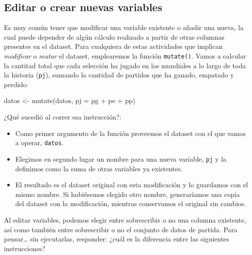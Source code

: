 \documentclass[
]{book}
\newenvironment{Shaded}{\begin{snugshade}}{\end{snugshade}}
\newcommand{\AttributeTok}[1]{\textcolor[rgb]{0.77,0.63,0.00}{#1}}
\newcommand{\FunctionTok}[1]{\textcolor[rgb]{0.00,0.00,0.00}{#1}}
\newcommand{\NormalTok}[1]{#1}
\newcommand{\OtherTok}[1]{\textcolor[rgb]{0.56,0.35,0.01}{#1}}
\newcommand{\SpecialCharTok}[1]{\textcolor[rgb]{0.00,0.00,0.00}{#1}}
\providecommand{\tightlist}{%
  \setlength{\itemsep}{0pt}\setlength{\parskip}{0pt}}
\begin{document}
\hypertarget{editar-o-crear-nuevas-variables}{%
\subsection{Editar o crear nuevas variables}\label{editar-o-crear-nuevas-variables}}

Es muy común tener que modificar una variable existente o añadir una nueva, la cual puede depender de algún cálculo realizado a partir de otras columnas presentes en el dataset. Para cualquiera de estas actividades que implican \emph{modificar} o \emph{mutar} el dataset, emplearemos la función \texttt{mutate()}. Vamos a calcular la cantitad total que cada selección ha jugado en los mundiales a lo largo de toda la historia (\texttt{pj}), sumando la cantidad de partidos que ha ganado, empatado y perdido:

\begin{Shaded}
\begin{Highlighting}[]
\NormalTok{datos }\OtherTok{\textless{}{-}} \FunctionTok{mutate}\NormalTok{(datos, }\AttributeTok{pj =}\NormalTok{ pg }\SpecialCharTok{+}\NormalTok{ pe }\SpecialCharTok{+}\NormalTok{ pp)}
\end{Highlighting}
\end{Shaded}

¿Qué sucedió al correr esa instrucción?:

\begin{itemize}
\tightlist
\item
  Como primer argumento de la función proveemos el dataset con el que vamos a operar, \texttt{datos}.
\item
  Elegimos en segundo lugar un nombre para una nueva variable, \texttt{pj} y la definimos como la suma de otras variables ya existentes.
\item
  El resultado es el dataset original con esta modificación y lo guardamos con el mismo nombre. Si hubiésemos elegido otro nombre, generaríamos una copia del dataset con la modificación, mientras conservamos el original sin cambios.
\end{itemize}

Al editar variables, podemos elegir entre sobrescribir o no una columna existente, así como también entre sobrescribir o no el conjunto de datos de partida. Para pensar\ldots{} sin ejecutarlas, responder: ¿cuál es la diferencia entre las siguientes instrucciones?
\end{document}

